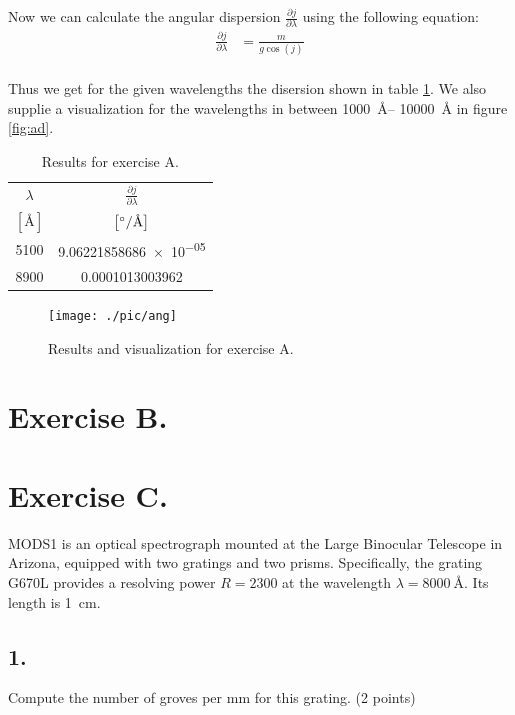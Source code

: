 \documentclass[11pt,a4paper,twoside]{article}
\begin{document}
Now we can calculate the angular dispersion $\frac{\partial j}{\partial\lambda}$ 
using the following equation:
\begin{align}
    \frac{\partial j}{\partial \lambda} &= \frac{m}{g\cos(j)}    \\
\end{align}

Thus we get for the given wavelengths the disersion shown in table \ref{tab:ad}.
We also supplie a visualization for the wavelengths in between \SIrange{1000}{
10000}{\angstrom} in figure \ref{fig:ad}.
\begin{table}[h!]
\centering
\begin{tabular}{cc}\toprule
    $\lambda$   & $\frac{\partial j}{\partial \lambda}$  \\
    $\left[\si{\angstrom}\right]$ 
                & $\left[\si[per-mode=symbol]{\degree\per\angstrom}\right]$ \\
    \midrule
    5100        &   \num[round-mode=places, round-precision=4]{9.06221858686e-05} \\
    8900        &   \num[round-mode=places, round-precision=4]{0.0001013003962}   \\
\bottomrule
\end{tabular}
\caption{Results for exercise A.}
\label{tab:ad}
\end{table}

\begin{figure}
\centering
\texttt{[image: ./pic/ang]}
\caption{Results and visualization for exercise A.}
\end{figure}

\section*{Exercise B.}
\section*{Exercise C.}

MODS1 is an optical spectrograph mounted at the Large Binocular Telescope in Arizona, equipped with two gratings and two prisms. Specifically, the grating G670L provides a resolving power $R = \num{2300}$ at the wavelength $\lambda = \SI{8000}{\angstrom}$. Its length is \SI{1}{\cm}.

\subsection*{1.} Compute the number of groves per mm for this grating. (2 points) \\
\end{document}
